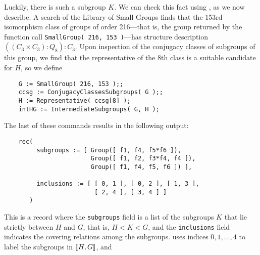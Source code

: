 \begin{center}
\end{center}

Luckily, there is
such a subgroup $K$. We can check this fact using \gap, as we now describe.
A search of the \gap Library of Small Groups finds that the 153rd
isomorphism class of groups of order 216---that is, the group 
returned by the function call {\tt SmallGroup( 216, 153 )}---has 
structure description $((C_3 \times C_3) : Q_8) : C_3$.
Upon inspection of the conjugacy classes of subgroups of this group, we 
find that the representative of the 8th class is a suitable candidate for 
$H$, so we define 

{\small 
\begin{verbatim}
    G := SmallGroup( 216, 153 );;    
    ccsg := ConjugacyClassesSubgroups( G );;
    H := Representative( ccsg[8] );
    intHG := IntermediateSubgroups( G, H );
\end{verbatim}
}

\noindent 
The last of these commands results in the following output:

{\small 
\begin{verbatim}
    rec( 
         subgroups := [ Group([ f1, f4, f5*f6 ]), 
                        Group([ f1, f2, f3*f4, f4 ]), 
                        Group([ f1, f4, f5, f6 ]) ], 

         inclusions := [ [ 0, 1 ], [ 0, 2 ], [ 1, 3 ], 
                         [ 2, 4 ], [ 3, 4 ] ] 
       )
\end{verbatim}
}

\noindent This is a record where the {\tt subgroups} field is a list of
the subgroups $K$ that lie strictly between $H$ and $G$, that is, $H < K < G$,
and the {\tt inclusions} field indicates the covering
relations among the subgroups.
\gap uses indices $0, 1, \dots, 4$ to label the subgroups 
in $\llbracket H, G\rrbracket$, and %



